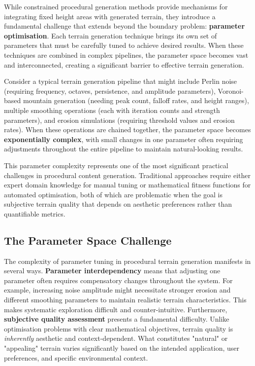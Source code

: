 While constrained procedural generation methods provide mechanisms for integrating fixed height areas with generated terrain, they introduce a fundamental challenge that extends beyond the boundary problem: \textbf{parameter optimisation}. Each terrain generation technique brings its own set of parameters that must be carefully tuned to achieve desired results. When these techniques are combined in complex pipelines, the parameter space becomes vast and interconnected, creating a significant barrier to effective terrain generation.

Consider a typical terrain generation pipeline that might include Perlin noise (requiring frequency, octaves, persistence, and amplitude parameters), Voronoi-based mountain generation (needing peak count, falloff rates, and height ranges), multiple smoothing operations (each with iteration counts and strength parameters), and erosion simulations (requiring threshold values and erosion rates). When these operations are chained together, the parameter space becomes \textbf{exponentially complex}, with small changes in one parameter often requiring adjustments throughout the entire pipeline to maintain natural-looking results.

This parameter complexity represents one of the most significant practical challenges in procedural content generation. Traditional approaches require either expert domain knowledge for manual tuning or mathematical fitness functions for automated optimisation, both of which are problematic when the goal is subjective terrain quality that depends on aesthetic preferences rather than quantifiable metrics.

\subsection{The Parameter Space Challenge}
\label{parameter_space_challenge}

The complexity of parameter tuning in procedural terrain generation manifests in several ways. \textbf{Parameter interdependency} means that adjusting one parameter often requires compensatory changes throughout the system. For example, increasing noise amplitude might necessitate stronger erosion and different smoothing parameters to maintain realistic terrain characteristics. This makes systematic exploration difficult and counter-intuitive. Furthermore, \textbf{subjective quality assessment} presents a fundamental difficulty. Unlike optimisation problems with clear mathematical objectives, terrain quality is \textit{inherently} aesthetic and context-dependent. What constitutes "natural" or "appealing" terrain varies significantly based on the intended application, user preferences, and specific environmental context.



